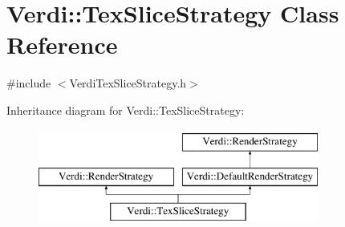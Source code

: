 \hypertarget{class_verdi_1_1_tex_slice_strategy}{\section{\-Verdi\-:\-:\-Tex\-Slice\-Strategy \-Class \-Reference}
\label{class_verdi_1_1_tex_slice_strategy}
}


{\ttfamily \#include $<$\-Verdi\-Tex\-Slice\-Strategy.\-h$>$}

\-Inheritance diagram for \-Verdi\-:\-:\-Tex\-Slice\-Strategy\-:\begin{figure}[H]
\begin{center}
\leavevmode
\includegraphics[height=3.000000cm]{class_verdi_1_1_tex_slice_strategy}
\end{center}
\end{figure}

